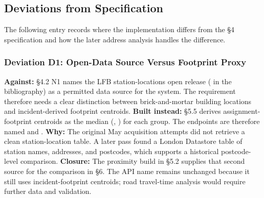 \subsection{Deviations from Specification}

The following entry records where the implementation differs from the §4 specification and how the later address analysis handles the difference.

\subsubsection{Deviation D1: Open-Data Source Versus Footprint Proxy}
\textbf{Against:} \S4.2 N1 names the LFB station-locations open release ( in the bibliography) as a permitted data source for the system. The requirement therefore needs a clear distinction between brick-and-mortar building locations and incident-derived footprint centroids.
\textbf{Built instead:} \S5.5 derives assignment-footprint centroids as the median (, ) for each  group. The endpoints are therefore named  and .
\textbf{Why:} The original May acquisition attempts did not retrieve a clean station-location table. A later pass found a London Datastore table of station names, addresses, and postcodes, which supports a historical postcode-level comparison.
\textbf{Closure:} The proximity build in \S5.2 supplies that second source for the comparison in \S6. The API name remains unchanged because it still uses incident-footprint centroids; road travel-time analysis would require further data and validation.
